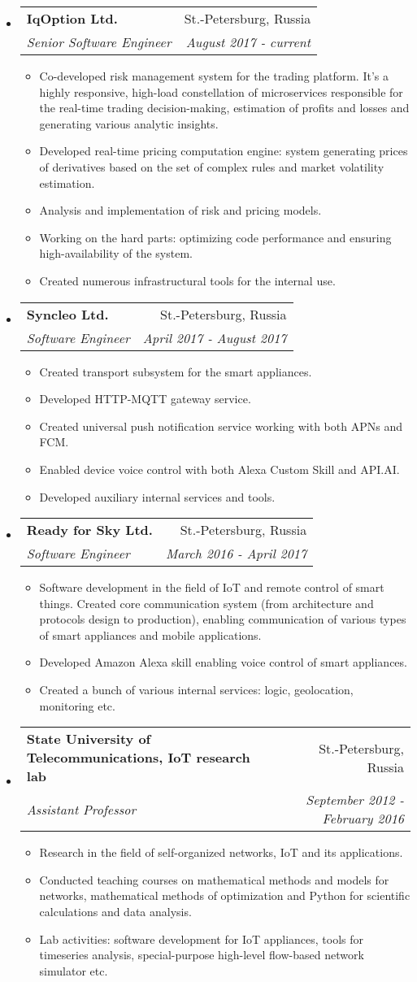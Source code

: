 \documentclass[letterpaper,11pt]{article}
\makeatletter
\newcommand{\resitem}[1]{\item #1 \vspace{-2pt}}
\newcommand{\ressubheading}[4]{
\begin{tabular*}{6.5in}{l@{\cftdotfill{\cftsecdotsep}\extracolsep{\fill}}r}
		\textbf{#1} & #2 \\
		\textit{#3} & \textit{#4} \\
\end{tabular*}\vspace{-6pt}}
\makeatother
\begin{document}
\begin{itemize}

\item
	\ressubheading{IqOption Ltd.}{St.-Petersburg, Russia}{Senior Software Engineer}{August 2017 - current}
	\begin{itemize}
		\resitem{Co-developed risk management system for the trading platform. It's a highly responsive, high-load constellation of microservices responsible for the real-time trading decision-making, estimation of profits and losses and generating various analytic insights.}
		\resitem{Developed real-time pricing computation engine: system generating prices of derivatives based on the set of complex rules and market volatility estimation.}
		\resitem{Analysis and implementation of risk and pricing models.}
		\resitem{Working on the hard parts: optimizing code performance and ensuring high-availability of the system.}
		\resitem{Created numerous infrastructural tools for the internal use.}
	\end{itemize}

\item
	\ressubheading{Syncleo Ltd.}{St.-Petersburg, Russia}{Software Engineer}{April 2017 - August 2017}
	\begin{itemize}
		\resitem{Created transport subsystem for the smart appliances.}
		\resitem{Developed HTTP-MQTT gateway service.}
		\resitem{Created universal push notification service working with both APNs and FCM.}
		\resitem{Enabled device voice control with both Alexa Custom Skill and API.AI.}
		\resitem{Developed auxiliary internal services and tools.}
	\end{itemize}

\item 
	\ressubheading{Ready for Sky Ltd.}{St.-Petersburg, Russia}{Software Engineer}{March 2016 - April 2017}
	\begin{itemize}
		\resitem{Software development in the field of IoT and remote control of smart things. Created core communication system (from architecture and protocols design to production), enabling communication of various types of smart appliances and mobile applications.}
		\resitem{Developed Amazon Alexa skill enabling voice control of smart appliances.}
		\resitem{Created a bunch of various internal services: logic, geolocation, monitoring etc.}
	\end{itemize}

\item 
	\ressubheading{State University of Telecommunications, IoT research lab}{St.-Petersburg, Russia}{Assistant Professor}{September 2012 - February 2016}
	\begin{itemize}
		\resitem{Research in the field of self-organized networks, IoT and its applications.}
		\resitem{Conducted teaching courses on mathematical methods and models for networks, mathematical methods of optimization and Python for scientific calculations and data analysis.}
		\resitem{Lab activities: software development for IoT appliances, tools for timeseries analysis, special-purpose high-level flow-based network simulator etc.}
	\end{itemize}


\end{itemize}
\end{document}
